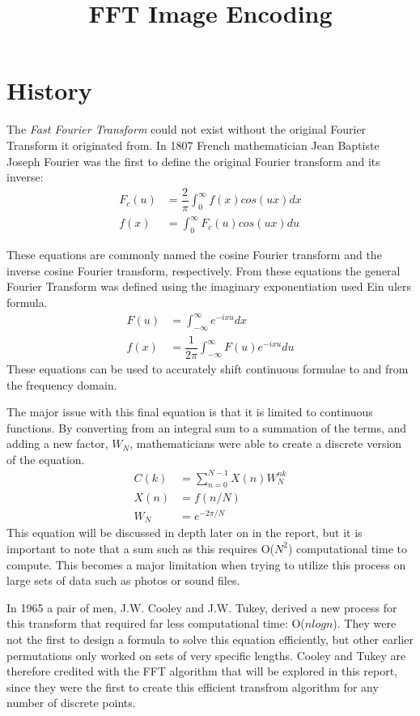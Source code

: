 \documentclass[sigplan]{acmart}
\title{FFT Image Encoding}
\begin{document}
\section{History}

The \textit{Fast Fourier Transform} could not exist without the original Fourier Transform it originated from. In 1807 French mathematician Jean Baptiste Joseph Fourier was the first to define the original Fourier transform and its inverse:
\begin{align*}
F_c(u) &= \dfrac{2}{\pi}\int_{0}^{\infty} f(x) cos(ux)dx\\
f(x) &= \int_{0}^{\infty}F_c(u)cos(ux)du
\end{align*}

These equations are commonly named the cosine Fourier transform and the inverse cosine Fourier transform, respectively. From these equations the general Fourier Transform was defined using the imaginary exponentiation used Ein ulers formula.
\begin{align*}
F(u) &= \int_{-\infty}^{\infty}e^{-ixu}dx\\
f(x) &= \dfrac{1}{2\pi}\int_{-\infty}^{\infty}F(u)e^{-ixu}du
\end{align*}
These equations can be used to accurately shift continuous formulae to and from the frequency domain. 

The major issue with this final equation is that it is limited to continuous functions. By converting from an integral sum to a summation of the terms, and adding a new factor, $W_N$, mathematicians were able to create a discrete version of the equation.
\begin{align*}
C(k) &= \sum_{n = 0}^{N-1}X(n)W_N^{nk}\\
X(n) &= f(n/N)\\
W_N &= e^{-2\pi/N}
\end{align*}
This equation will be discussed in depth later on in the report, but it is important to note that a sum such as this requires O($N^2$) computational time to compute. This becomes a major limitation when trying to utilize this process on large sets of data such as photos or sound files. 

In 1965 a pair of men, J.W. Cooley and J.W. Tukey, derived a new process for this transform that required far less computational time: O($nlogn$). They were not the first to design a formula to solve this equation efficiently, but other earlier permutations only worked on sets of very specific lengths. Cooley and Tukey are therefore credited with the FFT algorithm that will be explored in this report, since they were the first to create this efficient transfrom algorithm for any number of discrete points.
\end{document}

